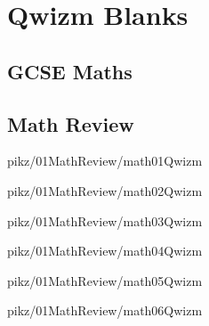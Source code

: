 \documentclass[9pt,xcolor={svgnames, x11names}]{beamer}
\begin{document}

\section{Qwizm Blanks}
\subsection{GCSE Maths}
\subsection{Math Review}




\begin{frame}{pikz/01MathReview/math01Qwizm}
    \resizebox{0.75\textwidth}{!}{%
    
  }
\end{frame}

\begin{frame}{pikz/01MathReview/math02Qwizm}
  \resizebox{0.75\textwidth}{!}{%
  
}
\end{frame}

\begin{frame}{pikz/01MathReview/math03Qwizm}
  
\end{frame}

\begin{frame}{pikz/01MathReview/math04Qwizm}
  
\end{frame}

\begin{frame}{pikz/01MathReview/math05Qwizm}
  
\end{frame}

\begin{frame}{pikz/01MathReview/math06Qwizm}
  
\end{frame}
\end{document}
